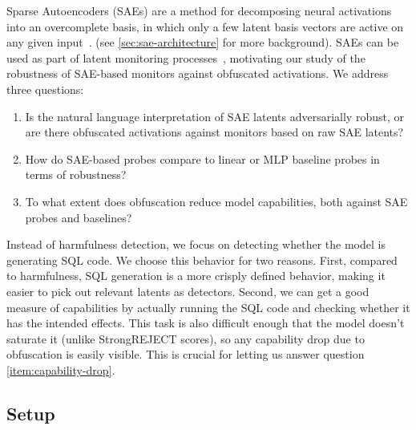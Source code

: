 \documentclass{article}
\begin{document}
Sparse Autoencoders (SAEs) are a method for decomposing neural activations 
into an overcomplete basis, in which only a few latent basis
vectors are active on any given
input~\citep{cunningham2023sparse,bricken2023monosemanticity}. 
(see \cref{sec:sae-architecture} for more background). SAEs can be
used as part of latent monitoring processes~\citep{marks2024sparse}, motivating
our study of the robustness of SAE-based monitors against obfuscated activations.
We address three questions:
\begin{enumerate}[(1)]
    \item Is the natural language interpretation of SAE latents 
    adversarially robust, or are there obfuscated activations 
    against monitors based on raw SAE latents?
    \label{item:raw-latent-question}
    \item How do SAE-based probes compare to linear or
    MLP baseline probes in terms of robustness?\label{item:sae-probe-question}
    \item To what extent does obfuscation reduce model
    capabilities, both against SAE probes and
    baselines?\label{item:capability-drop}
\end{enumerate}


Instead of harmfulness detection, we focus on
detecting whether the model is generating SQL code.
We choose this behavior for two reasons.
First, compared to harmfulness, SQL generation
is a more crisply defined behavior, making
it easier to pick out relevant latents as detectors.
Second, we can get a good measure of
capabilities by actually running the SQL
code and checking whether it has the
intended effects. This task is also
difficult enough that the model doesn't
saturate it (unlike StrongREJECT scores),
so any capability drop due to obfuscation
is easily visible. This is crucial for
letting us answer question
\ref{item:capability-drop}.





\subsection{Setup}
\end{document}
